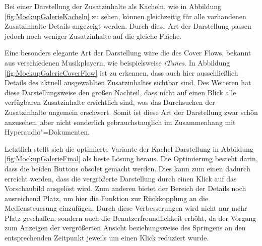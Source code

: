 Bei einer Darstellung der Zusatzinhalte als Kacheln, wie in Abbildung \ref{fig:MockupGalerieKacheln} zu sehen, können gleichzeitig für alle vorhandenen Zusatzinhalte Details angezeigt werden. Durch diese Art der Darstellung passen jedoch noch weniger Zusatzinhalte auf die gleiche Fläche.

Eine besonders elegante Art der Darstellung wäre die des Cover Flows, bekannt aus verschiedenen Musikplayern, wie beispielsweise \textit{iTunes}. In Abbildung \ref{fig:MockupGalerieCoverFlow} ist zu erkennen, dass auch hier ausschließlich Details des aktuell ausgewählten Zusatzinhaltes sichtbar sind. Des Weiteren hat diese Darstellungsweise den großen Nachteil, dass nicht auf einen Blick alle verfügbaren Zusatzinhalte ersichtlich sind, was das Durchsuchen der Zusatzinhalte ungemein erschwert. Somit ist diese Art der Darstellung zwar schön anzusehen, aber nicht sonderlich gebrauchstauglich im Zusammenhang mit Hyperaudio"=Dokumenten.

Letztlich stellt sich die optimierte Variante der Kachel-Darstellung in Abbildung \ref{fig:MockupGalerieFinal} als beste Lösung heraus. Die Optimierung besteht darin, dass die beiden Buttons obsolet gemacht werden. Dies kann zum einen dadurch erreicht werden, dass die vergrößerte Darstellung durch einen Klick auf das Vorschaubild ausgelöst wird. Zum anderen bietet der Bereich der Details noch ausreichend Platz, um hier die Funktion zur Rückkopplung an die Mediensteuerung einzufügen. Durch diese Verbesserungen wird nicht nur mehr Platz geschaffen, sondern auch die Benutzerfreundlichkeit erhöht, da der Vorgang zum Anzeigen der vergrößerten Ansicht beziehungsweise des Springens an den entsprechenden Zeitpunkt jeweils um einen Klick reduziert wurde.

